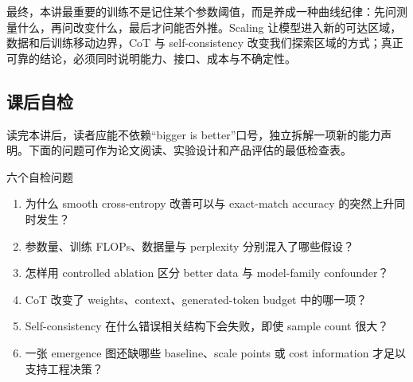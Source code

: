 最终，本讲最重要的训练不是记住某个参数阈值，而是养成一种曲线纪律：先问测量什么，再问改变什么，最后才问能否外推。Scaling 让模型进入新的可达区域，数据和后训练移动边界，CoT 与 self-consistency 改变我们探索区域的方式；真正可靠的结论，必须同时说明能力、接口、成本与不确定性。

\subsection{课后自检}

读完本讲后，读者应能不依赖“bigger is better”口号，独立拆解一项新的能力声明。下面的问题可作为论文阅读、实验设计和产品评估的最低检查表。

\begin{importantbox}{六个自检问题}
\begin{enumerate}
  \item 为什么 smooth cross-entropy 改善可以与 exact-match accuracy 的突然上升同时发生？
  \item 参数量、训练 FLOPs、数据量与 perplexity 分别混入了哪些假设？
  \item 怎样用 controlled ablation 区分 better data 与 model-family confounder？
  \item CoT 改变了 weights、context、generated-token budget 中的哪一项？
  \item Self-consistency 在什么错误相关结构下会失败，即使 sample count 很大？
  \item 一张 emergence 图还缺哪些 baseline、scale points 或 cost information 才足以支持工程决策？
\end{enumerate}
\end{importantbox}



